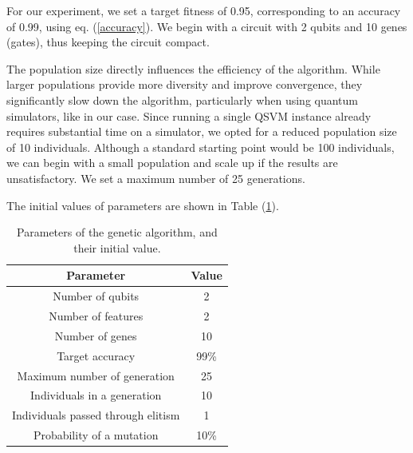 \documentclass[12pt]{article}
\begin{document}
For our experiment, we set a target fitness of 0.95, corresponding to an accuracy of 0.99, using eq. (\ref{accuracy}). We begin with a circuit with 2 qubits and 10 genes (gates), thus keeping the circuit compact.

The population size directly influences the efficiency of the algorithm. While larger populations provide more diversity and improve convergence, they significantly slow down the algorithm, particularly when using quantum simulators, like in our case. Since running a single QSVM instance already requires substantial time on a simulator, we opted for a reduced population size of 10 individuals. Although a standard starting point would be 100 individuals, we can begin with a small population and scale up if the results are unsatisfactory. We set a maximum number of 25 generations.

The initial values of parameters are shown in Table (\ref{tabella accettanza}).
\begin{table}[h]
    \centering
    \begin{tabular}{||c c||} 
     \hline
     Parameter & Value  \\ [0.5ex] 
     \hline\hline
     Number of qubits & 2 \\ 
     Number of features & 2  \\
     Number of genes & 10  \\
     Target accuracy & 99\%  \\ 
     Maximum number of generation & 25  \\
     Individuals in a generation & 10  \\ 
     Individuals passed through elitism & 1 \\
     Probability of a mutation & 10\% \\  
     \hline
    \end{tabular}
    \caption{Parameters of the genetic algorithm, and their initial value.}
    \label{tabella accettanza}
\end{table}
\end{document}
